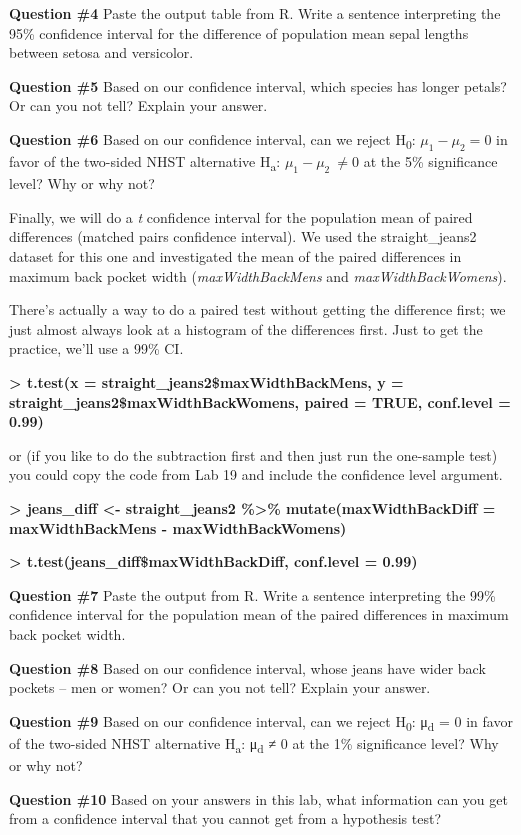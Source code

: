 \textbf{Question \#4} Paste the output table from R. Write a sentence
interpreting the 95\% confidence interval for the difference of
population mean sepal lengths between setosa and versicolor.

\textbf{Question \#5} Based on our confidence interval, which species
has longer petals? Or can you not tell? Explain your answer.

\textbf{Question \#6} Based on our confidence interval, can we reject
H\textsubscript{0}: \(\mu_{1} - \mu_{2} = 0\) in favor of the two-sided
NHST alternative H\textsubscript{a}: \(\mu_{1} - \mu_{2}\  \neq 0\) at
the 5\% significance level? Why or why not?

Finally, we will do a \emph{t} confidence interval for the population
mean of paired differences (matched pairs confidence interval). We used
the straight\_jeans2 dataset for this one and investigated the mean of
the paired differences in maximum back pocket width
(\emph{maxWidthBackMens} and \emph{maxWidthBackWomens}).

There's actually a way to do a paired test without getting the
difference first; we just almost always look at a histogram of the
differences first. Just to get the practice, we'll use a 99\% CI.

\textbf{\textgreater{} t.test(x = straight\_jeans2\$maxWidthBackMens, y
= straight\_jeans2\$maxWidthBackWomens, paired = TRUE, conf.level =
0.99)}

or (if you like to do the subtraction first and then just run the
one-sample test) you could copy the code from Lab 19 and include the
confidence level argument.

\textbf{\textgreater{} jeans\_diff \textless- straight\_jeans2
\%\textgreater\% mutate(maxWidthBackDiff = maxWidthBackMens -
maxWidthBackWomens)}

\textbf{\textgreater{} t.test(jeans\_diff\$maxWidthBackDiff, conf.level
= 0.99)}

\textbf{Question \#7} Paste the output from R. Write a sentence
interpreting the 99\% confidence interval for the population mean of the
paired differences in maximum back pocket width.

\textbf{Question \#8} Based on our confidence interval, whose jeans have
wider back pockets -- men or women? Or can you not tell? Explain your
answer.

\textbf{Question \#9} Based on our confidence interval, can we reject
H\textsubscript{0}: μ\textsubscript{d} = 0 in favor of the two-sided
NHST alternative H\textsubscript{a}: μ\textsubscript{d} ≠ 0 at the 1\%
significance level? Why or why not?

\textbf{Question \#10} Based on your answers in this lab, what
information can you get from a {confidence interval} that you cannot get
from a hypothesis test?
